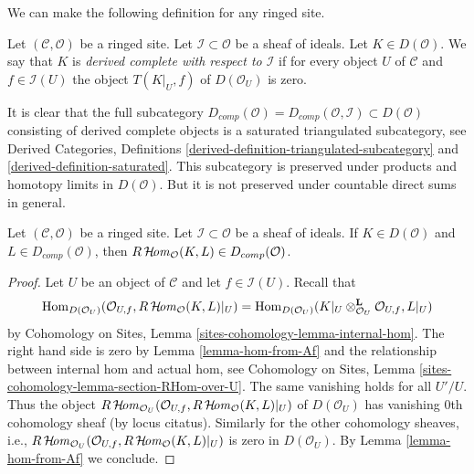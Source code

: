 \noindent
We can make the following definition for any ringed site.

\begin{definition}
\label{definition-derived-complete}
Let $(\mathcal{C}, \mathcal{O})$ be a ringed site.
Let $\mathcal{I} \subset \mathcal{O}$ be a sheaf of ideals.
Let $K \in D(\mathcal{O})$. We say that $K$ is
{\it derived complete with respect to $\mathcal{I}$}
if for every object $U$ of $\mathcal{C}$ and $f \in \mathcal{I}(U)$
the object $T(K|_U, f)$ of $D(\mathcal{O}_U)$ is zero.
\end{definition}

\noindent
It is clear that the full subcategory
$D_{comp}(\mathcal{O}) = D_{comp}(\mathcal{O}, \mathcal{I}) \subset
D(\mathcal{O})$ consisting of derived complete objects
is a saturated triangulated subcategory, see
Derived Categories, Definitions
\ref{derived-definition-triangulated-subcategory} and
\ref{derived-definition-saturated}. This subcategory is preserved
under products and homotopy limits in $D(\mathcal{O})$.
But it is not preserved under countable direct sums in general.

\begin{lemma}
\label{lemma-derived-complete-internal-hom}
Let $(\mathcal{C}, \mathcal{O})$ be a ringed site.
Let $\mathcal{I} \subset \mathcal{O}$ be a sheaf of ideals.
If $K \in D(\mathcal{O})$ and $L \in D_{comp}(\mathcal{O})$, then
$R\mathop{\mathcal{H}\!\mathit{om}}\nolimits_\mathcal{O}(K, L) \in D_{comp}(\mathcal{O})$.
\end{lemma}

\begin{proof}
Let $U$ be an object of $\mathcal{C}$ and let $f \in \mathcal{I}(U)$.
Recall that
$$
\mathop{\mathrm{Hom}}\nolimits_{D(\mathcal{O}_U)}(\mathcal{O}_{U, f}, R\mathop{\mathcal{H}\!\mathit{om}}\nolimits_\mathcal{O}(K, L)|_U)
=
\mathop{\mathrm{Hom}}\nolimits_{D(\mathcal{O}_U)}(
K|_U \otimes_{\mathcal{O}_U}^\mathbf{L} \mathcal{O}_{U, f}, L|_U)
$$
by Cohomology on Sites, Lemma \ref{sites-cohomology-lemma-internal-hom}.
The right hand side is zero by Lemma \ref{lemma-hom-from-Af}
and the relationship between internal hom and actual hom, see
Cohomology on Sites, Lemma \ref{sites-cohomology-lemma-section-RHom-over-U}.
The same vanishing holds for all $U'/U$. Thus the object
$R\mathop{\mathcal{H}\!\mathit{om}}\nolimits_{\mathcal{O}_U}(\mathcal{O}_{U, f},
R\mathop{\mathcal{H}\!\mathit{om}}\nolimits_\mathcal{O}(K, L)|_U)$ of $D(\mathcal{O}_U)$ has vanishing
$0$th cohomology sheaf (by locus citatus). Similarly for the other
cohomology sheaves, i.e., $R\mathop{\mathcal{H}\!\mathit{om}}\nolimits_{\mathcal{O}_U}(\mathcal{O}_{U, f},
R\mathop{\mathcal{H}\!\mathit{om}}\nolimits_\mathcal{O}(K, L)|_U)$ is zero in $D(\mathcal{O}_U)$.
By Lemma \ref{lemma-hom-from-Af} we conclude.
\end{proof}

